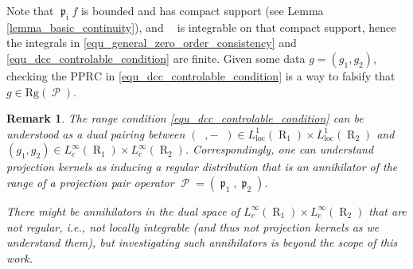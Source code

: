 \documentclass[12pt]{article}
\newtheorem{remark}[theorem]{Remark}
\DeclareMathOperator{\projvariable}{i}
\DeclareMathOperator{\Proj}{\mathcal{P}}
\DeclareMathOperator{\Projind}{\mathfrak{p}}
\newcommand{\dd}[1]{\,\mathrm{d}{#1}}
\newcommand{\rg}[1]{\mathrm{Rg}({#1})}
\DeclareMathOperator{\rotated}{\,\circlearrowleft}
\DeclareMathOperator{\rayvariable}{r}
\DeclareMathOperator{\raygroundset}{R}
\DeclareMathOperator{\Vone}{V_1}
\DeclareMathOperator{\Vtwo}{V_2}
\DeclareMathOperator{\Vvariable}{{V_{\projvariable}}}
\DeclareMathOperator{\Wone}{W_1}
\DeclareMathOperator{\Wtwo}{W_2}
\newcommand{\conditionname}{$\mathrm{PPRC}$}
\DeclareMathOperator{\imgdom}{{\Omega}}
\DeclareMathOperator{\sinodom}{{\mathcal S}}
\begin{document}
Note that $\Projind_{\projvariable}f$ is bounded and has compact support (see Lemma \ref{lemma_basic_continuity}), and $\Vvariable$ is integrable on that compact support, hence the integrals in \eqref{equ_general_zero_order_consistency} and \eqref{equ_dcc_controlable_condition} are finite. Given some data $g=(g_1,g_2)$, checking the \conditionname{} in \eqref{equ_dcc_controlable_condition} is a way to falsify that $g\in \rg{\Proj}$.

 







\begin{remark}
\label{remark_orthogonal_conditions}
The range condition \eqref{equ_dcc_controlable_condition} can be understood as a dual pairing between $(\Vone,-\Vtwo)\in L^1_\text{loc}(\raygroundset_1)\times L^1_\text{loc}(\raygroundset_2)$ and $(g_1,g_2)\in L^\infty_c(\raygroundset_1)\times L^\infty_c(\raygroundset_2)$. Correspondingly, one can understand projection kernels as inducing a regular distribution that is an annihilator of the range of a projection pair operator $\Proj=(\Projind_1,\Projind_2)$. 


There might be annihilators in the dual space of $L^\infty_c(\raygroundset_1)\times L^\infty_c(\raygroundset_2)$ that are not regular, i.e., not locally integrable (and thus not  projection kernels as we understand them), but investigating such annihilators is beyond the scope of this work. 

\end{remark}
\end{document}
